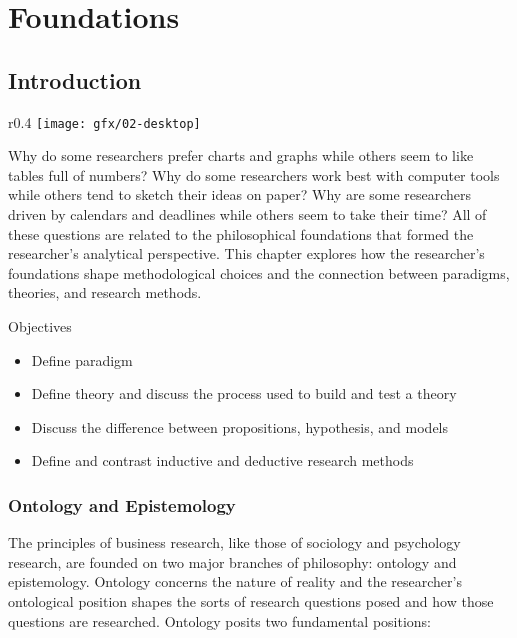 \chapter{Foundations}\label{02:foundations}
\section{Introduction}

\begin{wrapfigure}{r}{0.4\textwidth}
	\label{02:fig01} 
	\centering
	\texttt{[image: gfx/02-desktop]} 
\end{wrapfigure}
Why do some researchers prefer charts and graphs while others seem to like tables full of numbers? Why do some researchers work best with computer tools while others tend to sketch their ideas on paper? Why are some researchers driven by calendars and deadlines while others seem to take their time? All of these questions are related to the philosophical foundations that formed the researcher's analytical perspective. This chapter explores how the researcher's foundations shape methodological choices and the connection between paradigms, theories, and research methods.

\begin{center}
	\begin{objbox}{Objectives}
		\begin{itemize}
			\setlength{\itemsep}{0pt}
			\setlength{\parskip}{0pt}
			\setlength{\parsep}{0pt}
			
			\item Define paradigm
			\item Define theory and discuss the process used to build and test a theory
			\item Discuss the difference between propositions, hypothesis, and models
			\item Define and contrast inductive and deductive research methods
		\end{itemize}
	\end{objbox}
\end{center}


\subsection{Ontology and Epistemology}

The principles of business research, like those of sociology and psychology research, are founded on two major branches of philosophy: \gls{ontology} and \gls{epistemology}. Ontology concerns the nature of reality and the researcher's ontological position shapes the sorts of research questions posed and how those questions are researched. Ontology posits two fundamental positions:

